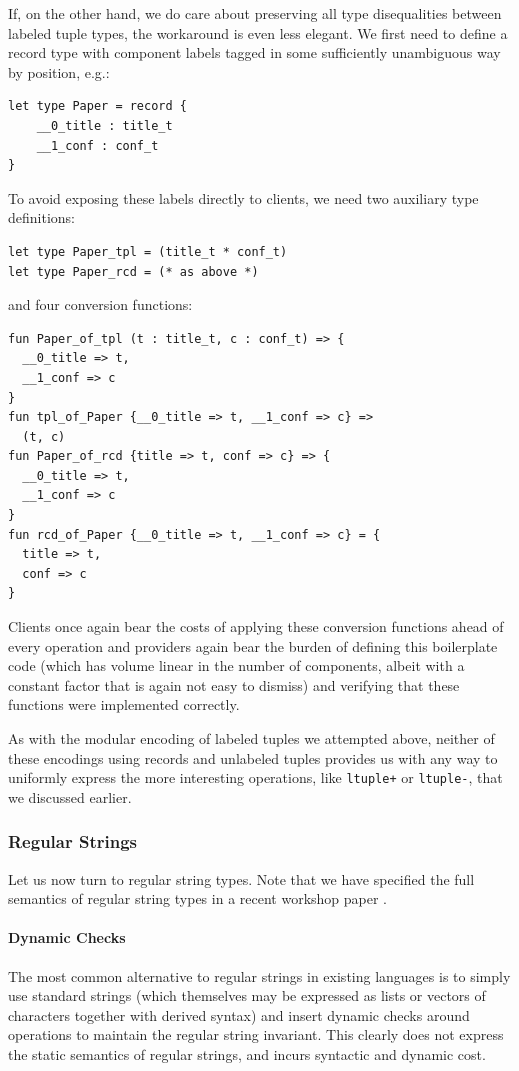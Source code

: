 If, on the other hand, we do care about preserving all type disequalities between labeled tuple types, the workaround is even less elegant. We first need to define a record type with component labels tagged in some sufficiently unambiguous way by position, e.g.:
\begin{lstlisting}[numbers=none]
let type Paper = record {
	__0_title : title_t
	__1_conf : conf_t 
}\end{lstlisting}
To avoid exposing these labels directly to clients, we need two auxiliary type definitions:
\begin{lstlisting}[numbers=none]
let type Paper_tpl = (title_t * conf_t)
let type Paper_rcd = (* as above *)
\end{lstlisting}
and four conversion functions:
\begin{lstlisting}[numbers=none]
fun Paper_of_tpl (t : title_t, c : conf_t) => {
  __0_title => t,
  __1_conf => c
}
fun tpl_of_Paper {__0_title => t, __1_conf => c} => 
  (t, c)
fun Paper_of_rcd {title => t, conf => c} => {
  __0_title => t,
  __1_conf => c
}
fun rcd_of_Paper {__0_title => t, __1_conf => c} = {
  title => t,
  conf => c
}
\end{lstlisting}
Clients once again bear the costs of applying these conversion functions ahead of every operation and providers again bear the burden of defining this boilerplate code (which has volume linear in the number of components, albeit with a constant factor that is again not easy to dismiss) and verifying that these functions were implemented correctly. %

As with the modular encoding of labeled tuples we attempted above, neither of these encodings using records and unlabeled tuples provides us with any way to uniformly express the more interesting operations, like \lstinline{ltuple+} or \lstinline{ltuple-}, that we discussed earlier.

\subsubsection{Regular Strings}
Let us now turn to regular string types. Note that we have specified the full semantics of regular string types in a recent workshop paper \cite{sanitation-psp14}.

\paragraph{Dynamic Checks}
The most common alternative to regular strings in existing languages is to simply use standard strings (which themselves may be expressed as lists or vectors of characters together with derived syntax) and insert dynamic checks around operations to maintain the regular string invariant. This clearly does not express the static semantics of regular strings, and incurs syntactic and dynamic cost.

